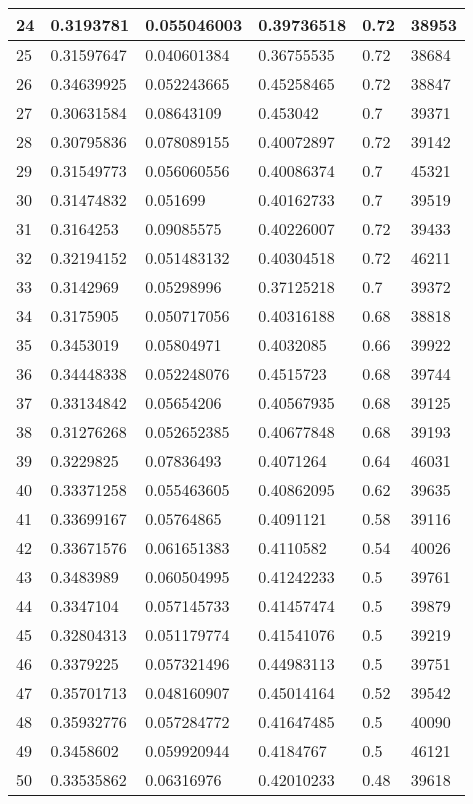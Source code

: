\begin{longtable}{|l|l|l|l|l|l|}
24 & 0.3193781 & 0.055046003 & 0.39736518 & 0.72 & 38953 \\ \hline 
25 & 0.31597647 & 0.040601384 & 0.36755535 & 0.72 & 38684 \\ \hline 
26 & 0.34639925 & 0.052243665 & 0.45258465 & 0.72 & 38847 \\ \hline 
27 & 0.30631584 & 0.08643109 & 0.453042 & 0.7 & 39371 \\ \hline 
28 & 0.30795836 & 0.078089155 & 0.40072897 & 0.72 & 39142 \\ \hline 
29 & 0.31549773 & 0.056060556 & 0.40086374 & 0.7 & 45321 \\ \hline 
30 & 0.31474832 & 0.051699 & 0.40162733 & 0.7 & 39519 \\ \hline 
31 & 0.3164253 & 0.09085575 & 0.40226007 & 0.72 & 39433 \\ \hline 
32 & 0.32194152 & 0.051483132 & 0.40304518 & 0.72 & 46211 \\ \hline 
33 & 0.3142969 & 0.05298996 & 0.37125218 & 0.7 & 39372 \\ \hline 
34 & 0.3175905 & 0.050717056 & 0.40316188 & 0.68 & 38818 \\ \hline 
35 & 0.3453019 & 0.05804971 & 0.4032085 & 0.66 & 39922 \\ \hline 
36 & 0.34448338 & 0.052248076 & 0.4515723 & 0.68 & 39744 \\ \hline 
37 & 0.33134842 & 0.05654206 & 0.40567935 & 0.68 & 39125 \\ \hline 
38 & 0.31276268 & 0.052652385 & 0.40677848 & 0.68 & 39193 \\ \hline 
39 & 0.3229825 & 0.07836493 & 0.4071264 & 0.64 & 46031 \\ \hline 
40 & 0.33371258 & 0.055463605 & 0.40862095 & 0.62 & 39635 \\ \hline 
41 & 0.33699167 & 0.05764865 & 0.4091121 & 0.58 & 39116 \\ \hline 
42 & 0.33671576 & 0.061651383 & 0.4110582 & 0.54 & 40026 \\ \hline 
43 & 0.3483989 & 0.060504995 & 0.41242233 & 0.5 & 39761 \\ \hline 
44 & 0.3347104 & 0.057145733 & 0.41457474 & 0.5 & 39879 \\ \hline 
45 & 0.32804313 & 0.051179774 & 0.41541076 & 0.5 & 39219 \\ \hline 
46 & 0.3379225 & 0.057321496 & 0.44983113 & 0.5 & 39751 \\ \hline 
47 & 0.35701713 & 0.048160907 & 0.45014164 & 0.52 & 39542 \\ \hline 
48 & 0.35932776 & 0.057284772 & 0.41647485 & 0.5 & 40090 \\ \hline 
49 & 0.3458602 & 0.059920944 & 0.4184767 & 0.5 & 46121 \\ \hline 
50 & 0.33535862 & 0.06316976 & 0.42010233 & 0.48 & 39618 \\ \hline 
\end{longtable}